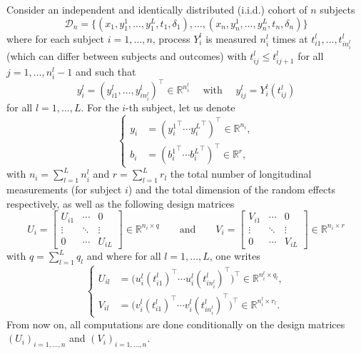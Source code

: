 \documentclass[11pt]{article}
\newcommand{\cD}{\mathcal D}
\newcommand{\R}{\mathds R}
\begin{document}
Consider an independent and identically distributed (i.i.d.) cohort of $n$ subjects
\begin{equation}
  \label{eq:dataset-def}
  \cD_n = \big\{ (x_1, y_1^1, \ldots, y_1^L, t_1, \delta_1), \ldots, (x_n, y_n^1, \ldots, y_n^L, t_n, \delta_n) \big\}
\end{equation}
where for each subject $i=1, \ldots, n$, process $Y_i^l$ is measured $n_i^l$ times at $t_{i1}^l, \ldots, t_{in_i^l}^l$ (which can differ between subjects and outcomes) with $t_{ij}^l \leq t_{ij+1}^l$ for all $j=1, \ldots, n_i^l-1$ and such that
\begin{equation}
  \label{eq:def-yil}
  y_i^l=(y_{i1}^l, \ldots, y_{in_i^l}^l)^\top \in \R^{n_i^l} \quad \text{ with } \quad y_{ij}^l=Y_i^l(t_{ij}^l) 
\end{equation}
for all $l=1, \ldots, L$. 
For the $i$-th subject, let us denote 
\[
\left\{
    \begin{array}{ll}
        y_i &= ({y_i^1}^\top \cdots {y_i^L}^\top)^\top \in \R^{n_i},\\
        b_i &= ({b_i^1}^\top \cdots {b_i^L}^\top)^\top \in \R^r,
    \end{array}
\right.
\]
with $n_i = \sum_{l=1}^L n_i^l$ and $r = \sum_{l=1}^L r_l$ the total number of longitudinal measurements (for subject $i$) and the total dimension of the random effects respectively, as well as the following design matrices
\[ U_i = 
\begin{bmatrix}
  U_{i1} & \cdots & 0\\
  \vdots &  \ddots & \vdots \\
  0 & \cdots & U_{iL}
\end{bmatrix} 
\in \R^{n_i \times q}
\qquad \text{and} \qquad
V_i = 
\begin{bmatrix}
  V_{i1} & \cdots & 0\\
  \vdots &  \ddots & \vdots \\
  0 & \cdots & V_{iL}
\end{bmatrix}
\in \R^{n_i \times r}
\]
with $q = \sum_{l=1}^L q_l$ and where for all $l=1, \ldots, L$, one writes
\[
\left\{
    \begin{array}{ll}
        U_{il} &= \big(u_i^l(t_{i1}^l)^\top \cdots u_i^l(t_{in_i^l}^l)^\top\big)^\top \in \R^{n_i^l \times q_l},\\
        V_{il} &= \big(v_i^l(t_{i1}^l)^\top \cdots v_i^l(t_{in_i^l}^l)^\top\big)^\top \in \R^{n_i^l \times r_l}.
    \end{array}
\right.
\]
From now on, all computations are done conditionally on the design matrices $(U_i)_{i=1, \dots, n}$ and $(V_i)_{i=1, \dots, n}$.
\end{document}
